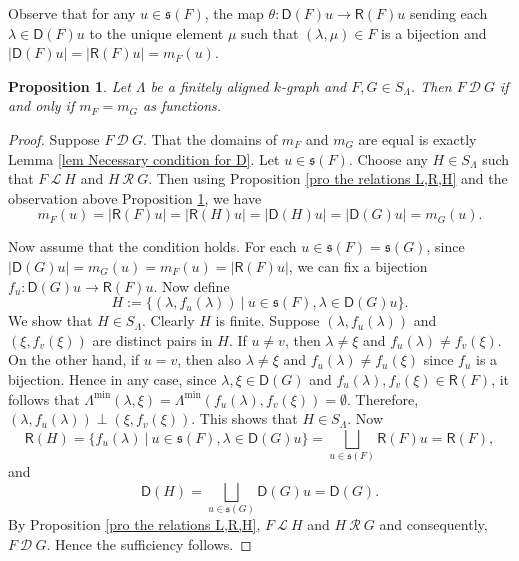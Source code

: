 \documentclass[a4paper,reqno,11pt]{amsart}
\numberwithin{equation}{section}
\newtheorem{prop}[thm]{Proposition}
\theoremstyle{definition}
\theoremstyle{remark}
\begin{document}
Observe that for any $u\in \mathfrak{s}(F)$, the map $\theta:\mathsf{D}(F)u\longrightarrow \mathsf{R}(F)u$ sending each $\lambda\in \mathsf{D}(F)u$ to the unique element $\mu$ such that $(\lambda,\mu)\in F$ is a bijection and $|\mathsf{D}(F)u|=|\mathsf{R}(F)u|=m_F(u)$. 
\begin{prop}\label{pro necessary and sufficient condition for D}
Let $\Lambda$ be a finitely aligned $k$-graph and $F,G\in S_\Lambda$. Then $F~\mathscr{D}~G$ if and only if $m_F=m_G$ as functions.     
\end{prop}
\begin{proof}
Suppose $F~\mathscr{D}~G$. That the domains of $m_F$ and $m_G$ are equal is exactly Lemma \ref{lem Necessary condition for D}. Let $u\in \mathfrak{s}(F)$. Choose any $H\in S_\Lambda$ such that $F~\mathscr{L}~H$ and $H~\mathscr{R}~G$. Then using Proposition \ref{pro the relations L,R,H} and the observation above Proposition \ref{pro necessary and sufficient condition for D}, we have \[m_F(u)=|\mathsf{R}(F)u|=|\mathsf{R}(H)u|=|\mathsf{D}(H)u|=|\mathsf{D}(G)u|=m_G(u).\] 

Now assume that the condition holds. For each $u\in \mathfrak{s}(F)=\mathfrak{s}(G)$, since $|\mathsf{D}(G)u|=m_G(u)=m_F(u)=|\mathsf{R}(F)u|$, we can fix a bijection $f_u:\mathsf{D}(G)u\longrightarrow \mathsf{R}(F)u$. Now define \[H:=\{(\lambda,f_u(\lambda))~|~u\in \mathfrak{s}(F),\lambda\in \mathsf{D}(G)u\}.\] We show that $H\in S_\Lambda$. Clearly $H$ is finite. Suppose $(\lambda,f_u(\lambda))$ and $(\xi,f_v(\xi))$ are distinct pairs in $H$. If $u\neq v$, then $\lambda\neq \xi$ and $f_u(\lambda)\neq f_v(\xi)$. On the other hand, if $u=v$, then also $\lambda\neq \xi$ and $f_u(\lambda)\neq f_u(\xi)$ since $f_u$ is a bijection. Hence in any case, since $\lambda,\xi\in \mathsf{D}(G)$ and $f_u(\lambda),f_v(\xi)\in \mathsf{R}(F)$, it follows that $\Lambda^{\min}(\lambda,\xi)=\Lambda^{\min}(f_u(\lambda),f_v(\xi))=\emptyset$. Therefore, $(\lambda,f_u(\lambda))\perp (\xi,f_v(\xi))$. This shows that $H\in S_\Lambda$. Now \[\mathsf{R}(H)=\{f_u(\lambda)~|~u\in \mathfrak{s}(F),\lambda\in \mathsf{D}(G)u\}=\displaystyle{\bigsqcup_{u\in \mathfrak{s}(F)}}\mathsf{R}(F)u=\mathsf{R}(F),\] and \[\mathsf{D}(H)=\displaystyle{\bigsqcup_{u\in \mathfrak{s}(G)}}\mathsf{D}(G)u=\mathsf{D}(G).\] By Proposition \ref{pro the relations L,R,H}, $F~\mathscr{L}~H$ and $H~\mathscr{R}~G$ and consequently, $F~\mathscr{D}~G$. Hence the sufficiency follows. 
\end{proof}
\end{document}
